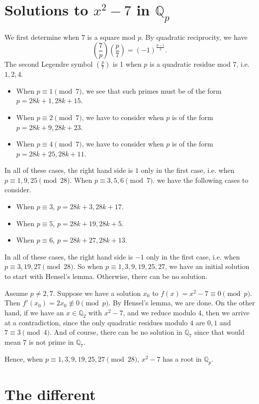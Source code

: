 \documentclass[12pt]{amsart}
\theoremstyle{named}
\newcommand{\legndr}[2]{\genfrac{(}{)}{}{}{#1}{#2}}
\newcommand{\Q}{\mathbb{Q}}
\newcommand{\Qp}{\Q_p}
\begin{document}
\section{Solutions to $x^2 - 7$ in $\Qp$} We first determine
when $7$ is a square mod $p$. By quadratic reciprocity, we have \[ \legndr 7 p \legndr p 7 =
(-1)^{\frac{p - 1}{2}}.\] The second Legendre symbol $\legndr p 7$ is 1 when $p$ is a quadratic
residue mod 7, i.e. $1, 2, 4$.
\begin{itemize}
\item When $p \equiv 1 \pmod 7$, we see that such primes must be of the form
$p = 28k + 1, 28k + 15$.
\item When $p \equiv 2 \pmod 7$, we have to consider when $p$ is of the form
$p = 28k + 9, 28k + 23$.
\item When $p \equiv 4 \pmod 7$, we have to consider when $p$ is of the form
$p = 28k + 25, 28k + 11$.
\end{itemize}
In all of these cases, the right hand side is $1$ only in the first case, i.e. when
$p \equiv 1, 9, 25 \pmod {28}$. When $p \equiv 3, 5, 6 \pmod 7$. we have the following cases to
consider.
\begin{itemize}
\item When $p \equiv 3$, $p = 28k + 3, 28k + 17$.
\item When $p \equiv 5$, $p = 28k + 19, 28k + 5$.
\item When $p \equiv 6$, $p = 28k + 27, 28k + 13$.
\end{itemize} In all of these cases, the right hand side is
$-1$ only in the first case, i.e. when $p \equiv 3, 19, 27 \pmod{28}$. So when $p \equiv 1, 3, 9,
19, 25, 27$, we have an initial solution to start with Hensel's lemma. Otherwise, there can be no
solution.

Assume $p \neq 2, 7$. Suppose we have a solution $x_0$ to $f(x) = x^2 - 7 \equiv 0 \pmod p$. Then
$f'(x_0) = 2x_0 \not\equiv 0 \pmod p$. By Hensel's lemma, we are done. On the other hand, if we have
an $x \in \Q_2$ with $x^2 - 7$, and we reduce modulo $4$, then we arrive at a contradiction, since
the only quadratic residues modulo $4$ are $0, 1$ and $7 \equiv 3 \pmod 4$. And of course, there can
be no solution in $\Q_7$ since that would mean $7$ is not prime in $\Q_7$.

Hence, when $p \equiv 1, 3, 9, 19, 25, 27 \pmod{28}$, $x^2 - 7$ has a root in $\Qp$.

\section{The different}
\end{document}

